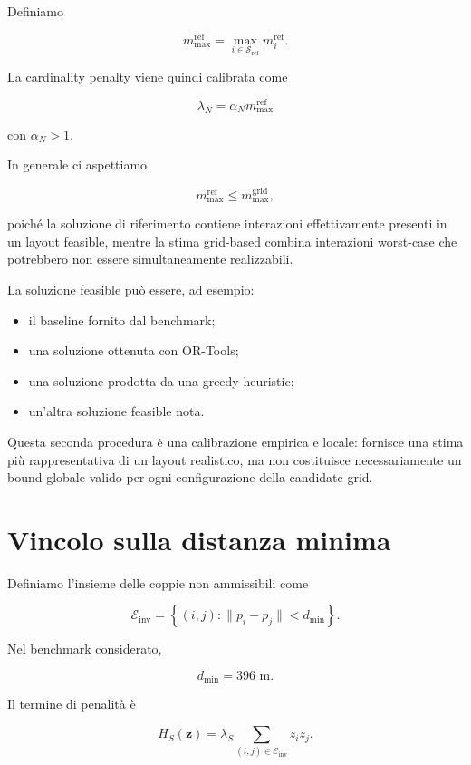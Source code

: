\documentclass[11pt,a4paper]{report}
\begin{document}
Definiamo

\[
m_{\max}^{\mathrm{ref}}
=
\max_{i\in\mathcal S_{\mathrm{ref}}}
m_i^{\mathrm{ref}}.
\]

La cardinality penalty viene quindi calibrata come

\[
\boxed{
\lambda_N
=
\alpha_N
m_{\max}^{\mathrm{ref}}
}
\]

con $\alpha_N>1$.

In generale ci aspettiamo

\[
m_{\max}^{\mathrm{ref}}
\leq
m_{\max}^{\mathrm{grid}},
\]

poiché la soluzione di riferimento contiene interazioni effettivamente
presenti in un layout feasible, mentre la stima grid-based combina
interazioni worst-case che potrebbero non essere simultaneamente
realizzabili.

La soluzione feasible può essere, ad esempio:

\begin{itemize}
    \item il baseline fornito dal benchmark;
    \item una soluzione ottenuta con OR-Tools;
    \item una soluzione prodotta da una greedy heuristic;
    \item un'altra soluzione feasible nota.
\end{itemize}

Questa seconda procedura è una calibrazione empirica e locale: fornisce
una stima più rappresentativa di un layout realistico, ma non costituisce
necessariamente un bound globale valido per ogni configurazione della
candidate grid.

\section{Vincolo sulla distanza minima}

Definiamo l'insieme delle coppie non ammissibili come

\[
\mathcal E_{\mathrm{inv}}
=
\left\{
(i,j):
\|p_i-p_j\|<d_{\min}
\right\}.
\]

Nel benchmark considerato,

\[
d_{\min}=396\text{ m}.
\]

Il termine di penalità è

\[
H_S(\mathbf z)
=
\lambda_S
\sum_{(i,j)\in\mathcal E_{\mathrm{inv}}}
z_i z_j.
\]
\end{document}
